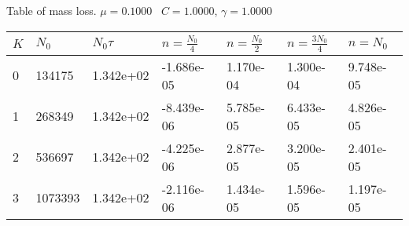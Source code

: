 \begin{center}
Table of mass loss. $\mu = 0.1000$ \, $C = 1.0000$, $\gamma = 1.0000$
  
\begin{tabular}{|p{0.8in}|p{0.8in}|p{0.8in}|p{0.8in}|p{0.8in}|p{0.8in}|p{0.8in}|} \hline
$K$ &$N_0$ &$N_0 \tau$ &$n = \frac{N_0}{4}$ &$n = \frac{N_0}{2}$ &$n = \frac{3N_0}{4}$ &$n = N_0$ \\ \hline 
0 &134175 &1.342e+02 &-1.686e-05 &1.170e-04 &1.300e-04 &9.748e-05 \\ \hline 
1 &268349 &1.342e+02 &-8.439e-06 &5.785e-05 &6.433e-05 &4.826e-05 \\ \hline 
2 &536697 &1.342e+02 &-4.225e-06 &2.877e-05 &3.200e-05 &2.401e-05 \\ \hline 
3 &1073393 &1.342e+02 &-2.116e-06 &1.434e-05 &1.596e-05 &1.197e-05 \\ \hline 

\end{tabular}\\[20pt]
\end{center}
